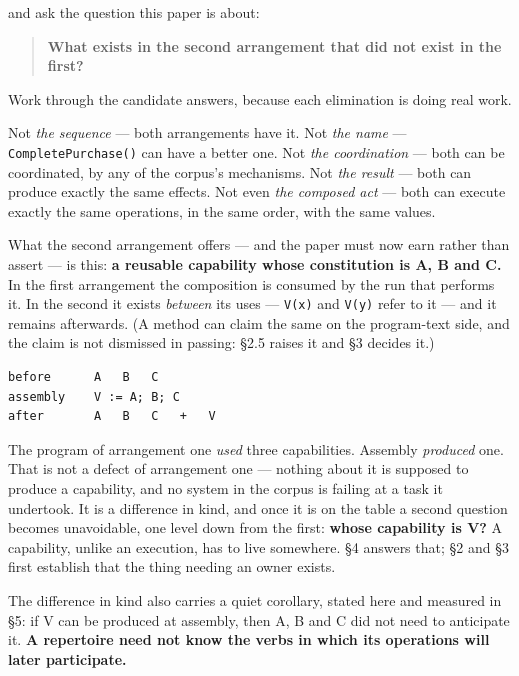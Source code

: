 \documentclass[
]{article}
\begin{document}
and ask the question this paper is about:

\begin{quote}
\textbf{What exists in the second arrangement that did not exist in the
first?}
\end{quote}

Work through the candidate answers, because each elimination is doing
real work.

Not \emph{the sequence} --- both arrangements have it. Not \emph{the
name} --- \texttt{CompletePurchase()} can have a better one. Not
\emph{the coordination} --- both can be coordinated, by any of the
corpus's mechanisms. Not \emph{the result} --- both can produce exactly
the same effects. Not even \emph{the composed act} --- both can execute
exactly the same operations, in the same order, with the same values.

What the second arrangement offers --- and the paper must now earn
rather than assert --- is this: \textbf{a reusable capability whose
constitution is A, B and C.} In the first arrangement the composition is
consumed by the run that performs it. In the second it exists
\emph{between} its uses --- \texttt{V(x)} and \texttt{V(y)} refer to it
--- and it remains afterwards. (A method can claim the same on the
program-text side, and the claim is not dismissed in passing: §2.5
raises it and §3 decides it.)

\begin{verbatim}
before      A   B   C
assembly    V := A; B; C
after       A   B   C   +   V
\end{verbatim}

The program of arrangement one \emph{used} three capabilities. Assembly
\emph{produced} one. That is not a defect of arrangement one --- nothing
about it is supposed to produce a capability, and no system in the
corpus is failing at a task it undertook. It is a difference in kind,
and once it is on the table a second question becomes unavoidable, one
level down from the first: \textbf{whose capability is V?} A capability,
unlike an execution, has to live somewhere. §4 answers that; §2 and §3
first establish that the thing needing an owner exists.

The difference in kind also carries a quiet corollary, stated here and
measured in §5: if V can be produced at assembly, then A, B and C did
not need to anticipate it. \textbf{A repertoire need not know the verbs
in which its operations will later participate.}
\end{document}
